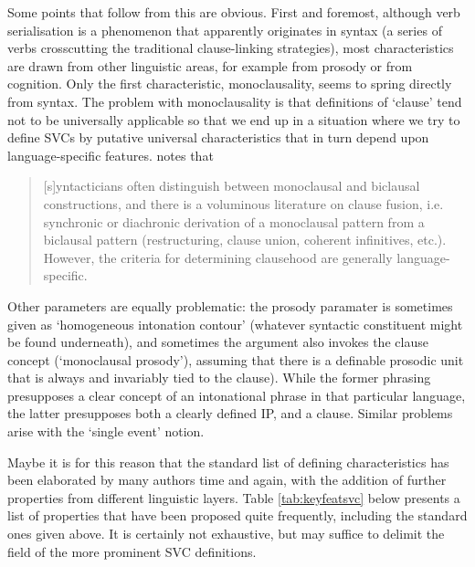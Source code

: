 Some points that follow from this are obvious. First and foremost, although verb serialisation is a phenomenon that apparently originates in syntax (a series of verbs crosscutting the traditional clause-linking strategies), most characteristics are drawn from other linguistic areas, for example from prosody or from cognition. Only the first characteristic, monoclausality, seems to spring directly from syntax. The problem with monoclausality is that definitions of `clause' tend not to be universally applicable so that we end up in a situation where we try to define SVCs by putative universal characteristics that in turn depend upon language-specific features. \citet[298]{haspelmath2016serial} notes that \begin{quote}[s]yntacticians often distinguish between monoclausal and biclausal constructions, and there is a voluminous literature on clause fusion, i.e. synchronic or diachronic derivation of a monoclausal pattern from a biclausal pattern
(restructuring, clause union, coherent infinitives, etc.). However, the criteria for determining clausehood are generally language-specific.\end{quote}

Other parameters are equally problematic: the prosody paramater is sometimes given as `homogeneous intonation contour' (whatever syntactic constituent might be found underneath), and sometimes the argument also invokes the clause concept (`monoclausal prosody'), assuming that there is a definable prosodic unit that is always and invariably tied to the clause). While the former phrasing presupposes a clear concept of an intonational phrase in that particular language, the latter presupposes both a clearly defined IP, and a clause. Similar problems arise with the `single event' notion.

Maybe it is for this reason that the standard list of defining characteristics has been elaborated by many authors time and again, with the addition of further properties from different linguistic layers. Table \ref{tab:keyfeatsvc} below presents a list of properties that have been proposed quite frequently, including the standard ones given above. It is certainly not exhaustive, but may suffice to delimit the field of the more prominent SVC definitions.

